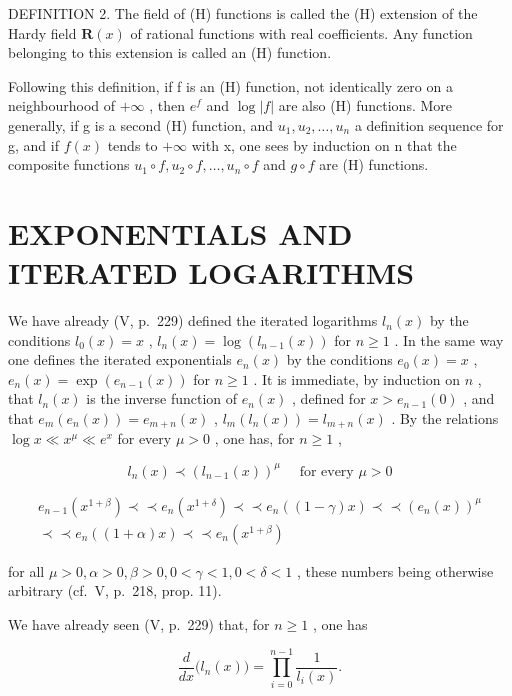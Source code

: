DEFINITION 2. The field of (H) functions is called the (H) extension of the Hardy field \(\mathbf{R}(x)\) of rational functions with real coefficients. Any function belonging to this extension is called an (H) function.

Following this definition, if f is an (H) function, not identically zero on a neighbourhood of \(+\infty\) , then \(e^{f}\) and \(\log |f|\) are also (H) functions. More generally, if g is a second (H) function, and \(u_{1}, u_{2}, \ldots, u_{n}\) a definition sequence for g, and if \(f(x)\) tends to \(+\infty\) with x, one sees by induction on n that the composite functions \(u_{1} \circ f, u_{2} \circ f, \ldots, u_{n} \circ f\) and \(g \circ f\) are (H) functions.

\section{EXPONENTIALS AND ITERATED LOGARITHMS}

We have already (V, p.~229) defined the iterated logarithms \(l_n(x)\) by the conditions \(l_0(x) = x\) , \(l_n(x) = \log(l_{n-1}(x))\) for \(n \geqslant 1\) . In the same way one defines the iterated exponentials \(e_n(x)\) by the conditions \(e_0(x) = x\) , \(e_n(x) = \exp(e_{n-1}(x))\) for \(n \geqslant 1\) . It is immediate, by induction on \(n\) , that \(l_n(x)\) is the inverse function of \(e_n(x)\) , defined for \(x > e_{n-1}(0)\) , and that \(e_m(e_n(x)) = e_{m+n}(x)\) , \(l_m(l_n(x)) = l_{m+n}(x)\) . By the relations \(\log x \ll x^\mu \ll e^x\) for every \(\mu > 0\) , one has, for \(n \geqslant 1\) ,

\[
l _ {n} (x) \prec (l _ {n - 1} (x)) ^ {\mu} \quad \text {   for   every   } \mu > 0\tag{5}
\]

\[
\begin{array}{c} e _ {n - 1} (x ^ {1 + \beta}) \prec \prec e _ {n} (x ^ {1 + \delta}) \prec \prec e _ {n} ((1 - \gamma) x) \prec \prec (e _ {n} (x)) ^ {\mu} \\ \prec \prec e _ {n} ((1 + \alpha) x) \prec \prec e _ {n} (x ^ {1 + \beta}) \end{array}\tag{6}
\]

for all \(\mu > 0, \alpha > 0, \beta > 0, 0 < \gamma < 1, 0 < \delta < 1\) , these numbers being otherwise arbitrary (cf.~V, p.~218, prop. 11).

We have already seen (V, p.~229) that, for \(n \geqslant 1\) , one has

\[
{\frac {d}{d x}} \big (l _ {n} (x) \big) = \prod_ {i = 0} ^ {n - 1} {\frac {1}{l _ {i} (x)}}.\tag{7}
\]

